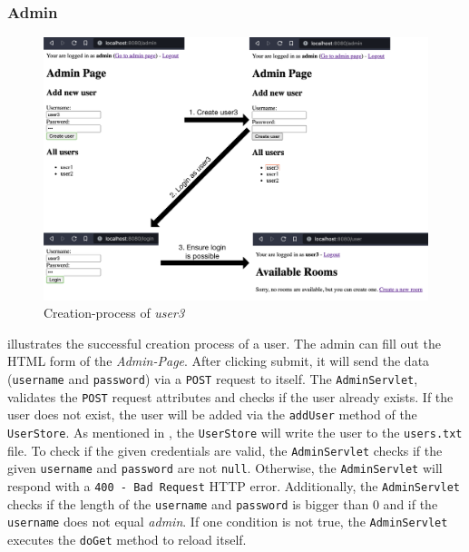 \subsubsection{Admin}\label{subsubsec:03_impl_servlets_admin}
\begin{figure}[h]
\centering
\includegraphics[scale=0.2]{images/03_impl/admin/create_user_all}
\caption{Creation-process of \textit{user3}}
\label{fig:03_impl_servlets_room_createall}
\end{figure}
 illustrates the successful creation process of a user.
The admin can fill out the HTML form of the \textit{Admin-Page}. After clicking submit, it will send the data (\texttt{username} and \texttt{password}) via a \texttt{POST} request to itself.
The \texttt{AdminServlet}, validates the \texttt{POST} request attributes and checks if the user already exists. If the user does not exist, the user will be added via the \texttt{addUser} method of the \texttt{UserStore}. As mentioned in , the \texttt{UserStore} will write the user to the \texttt{users.txt} file.
To check if the given credentials are valid, the \texttt{AdminServlet} checks if the given \texttt{username} and \texttt{password} are not \texttt{null}. Otherwise, the \texttt{AdminServlet} will respond with a \texttt{400 - Bad Request} HTTP error. Additionally, the \texttt{AdminServlet} checks if the length of the \texttt{username} and \texttt{password} is bigger than 0 and if the \texttt{username} does not equal \textit{admin}. If one condition is not true, the \texttt{AdminServlet} executes the \texttt{doGet} method to reload itself.


